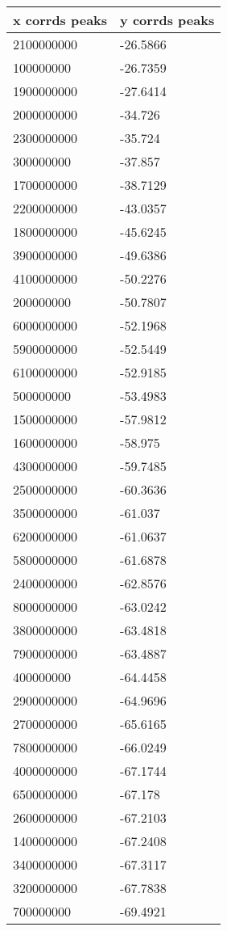 \begin{tabular}{ll}
x corrds peaks & y corrds peaks \\ 
\hline 
2100000000 & -26.5866 \\ 
100000000 & -26.7359 \\ 
1900000000 & -27.6414 \\ 
2000000000 & -34.726 \\ 
2300000000 & -35.724 \\ 
300000000 & -37.857 \\ 
1700000000 & -38.7129 \\ 
2200000000 & -43.0357 \\ 
1800000000 & -45.6245 \\ 
3900000000 & -49.6386 \\ 
4100000000 & -50.2276 \\ 
200000000 & -50.7807 \\ 
6000000000 & -52.1968 \\ 
5900000000 & -52.5449 \\ 
6100000000 & -52.9185 \\ 
500000000 & -53.4983 \\ 
1500000000 & -57.9812 \\ 
1600000000 & -58.975 \\ 
4300000000 & -59.7485 \\ 
2500000000 & -60.3636 \\ 
3500000000 & -61.037 \\ 
6200000000 & -61.0637 \\ 
5800000000 & -61.6878 \\ 
2400000000 & -62.8576 \\ 
8000000000 & -63.0242 \\ 
3800000000 & -63.4818 \\ 
7900000000 & -63.4887 \\ 
400000000 & -64.4458 \\ 
2900000000 & -64.9696 \\ 
2700000000 & -65.6165 \\ 
7800000000 & -66.0249 \\ 
4000000000 & -67.1744 \\ 
6500000000 & -67.178 \\ 
2600000000 & -67.2103 \\ 
1400000000 & -67.2408 \\ 
3400000000 & -67.3117 \\ 
3200000000 & -67.7838 \\ 
700000000 & -69.4921 \\ 

\end{tabular}
